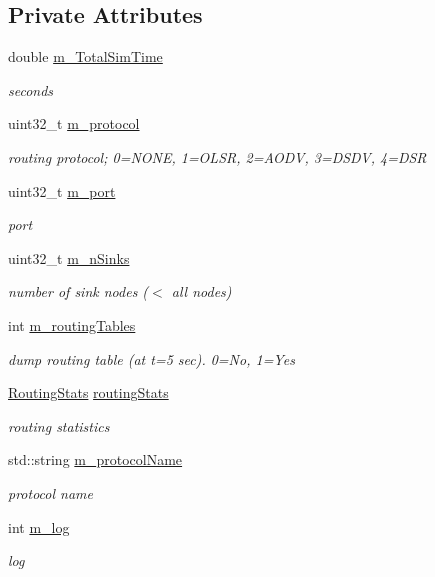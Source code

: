\subsection*{Private Attributes}
\begin{DoxyCompactItemize}
\item 
double \hyperlink{classRoutingHelper_a2aba8939d73d0ea57107d7c0ecfe6bca}{m\+\_\+\+Total\+Sim\+Time}
\begin{DoxyCompactList}\small\item\em seconds \end{DoxyCompactList}\item 
uint32\+\_\+t \hyperlink{classRoutingHelper_a14f730151136d699031105c1db7990b0}{m\+\_\+protocol}
\begin{DoxyCompactList}\small\item\em routing protocol; 0=N\+O\+NE, 1=O\+L\+SR, 2=A\+O\+DV, 3=D\+S\+DV, 4=D\+SR \end{DoxyCompactList}\item 
uint32\+\_\+t \hyperlink{classRoutingHelper_a986af262ca1d13b9ee4c0628936454b6}{m\+\_\+port}
\begin{DoxyCompactList}\small\item\em port \end{DoxyCompactList}\item 
uint32\+\_\+t \hyperlink{classRoutingHelper_acdb8f3c9431dbb2e425f76de24a77ff3}{m\+\_\+n\+Sinks}
\begin{DoxyCompactList}\small\item\em number of sink nodes ($<$ all nodes) \end{DoxyCompactList}\item 
int \hyperlink{classRoutingHelper_a39d850cd28027d771bb503c4f12e5986}{m\+\_\+routing\+Tables}
\begin{DoxyCompactList}\small\item\em dump routing table (at t=5 sec). 0=No, 1=Yes \end{DoxyCompactList}\item 
\hyperlink{classRoutingStats}{Routing\+Stats} \hyperlink{classRoutingHelper_ab41a23ccfe8daaad29b2a00ed8a78d11}{routing\+Stats}
\begin{DoxyCompactList}\small\item\em routing statistics \end{DoxyCompactList}\item 
std\+::string \hyperlink{classRoutingHelper_aec432269dde7fd896550370d29fb5eca}{m\+\_\+protocol\+Name}
\begin{DoxyCompactList}\small\item\em protocol name \end{DoxyCompactList}\item 
int \hyperlink{classRoutingHelper_a1f498457a16bb49a0aa7fa395848e0ed}{m\+\_\+log}
\begin{DoxyCompactList}\small\item\em log \end{DoxyCompactList}\end{DoxyCompactItemize}
